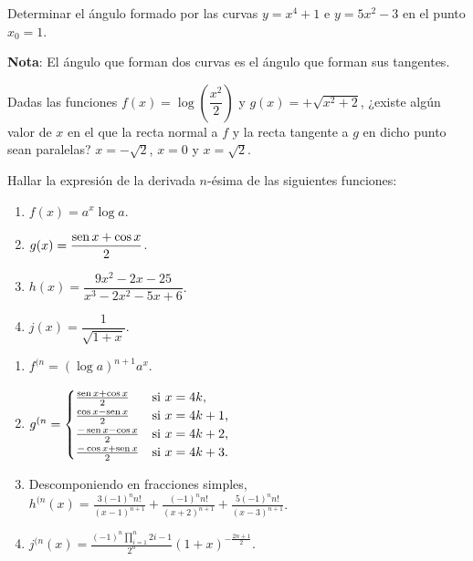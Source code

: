 {Determinar el ángulo formado por las curvas $y=x^4+1$ e $y=5x^2-3$ en el punto $x_{0}=1$.

\noindent \textbf{Nota}: El ángulo que forman dos curvas es el ángulo
que forman sus tangentes.
}


{Dadas las funciones $f(x)=\log \left(\dfrac{x^2}{2}\right)$ y $g(x)=+\sqrt{x^2+2}$, ¿existe algún valor de $x$ en el que la recta normal a $f$ y la recta tangente a $g$ en dicho punto sean paralelas?
}
{$x=-\sqrt{2}$, $x=0$ y $x=\sqrt{2}$.
}
{
}


{Hallar la expresión de la derivada $n$-ésima de las siguientes funciones:
\begin{multicols}{2}
\begin{enumerate}
\item  $f(x)=a^x\log a$.
\item  $g(x)=\dfrac{\operatorname{sen} x+\cos x}{2}$.
\item  $h(x)=\dfrac{9x^2-2x-25}{x^3-2x^2-5x+6}$.
\item  $j(x)=\dfrac{1}{\sqrt{1+x}}$.
\end{enumerate}
\end{multicols}
}
{\begin{enumerate}
\item $f^{(n} = (\log a)^{n+1} a^x$.
\item $g^{(n}=
\begin{cases}
\frac{\operatorname{sen} x + \cos x}{2} & \mbox{si $x=4k$,}\\
\frac{\cos x - \operatorname{sen} x}{2} & \mbox{si $x=4k+1$,}\\
\frac{-\operatorname{sen} x - \cos x}{2} & \mbox{si $x=4k+2$,}\\
\frac{-\cos x + \operatorname{sen} x}{2} & \mbox{si $x=4k+3$.}\\
\end{cases}$
\item Descomponiendo en fracciones simples, $h^{(n}(x) = \frac{3(-1)^n n!}{(x-1)^{n+1}} + \frac{(-1)^n n!}{(x+2)^{n+1}} + \frac{5(-1)^n n!}{(x-3)^{n+1}}$.
\item $j^{(n}(x) = \frac{(-1)^n \prod_{i=1}^{n}2i-1}{2^n}(1+x)^{-\frac{2n+1}{2}}$. 
\end{enumerate}
}
{
}


